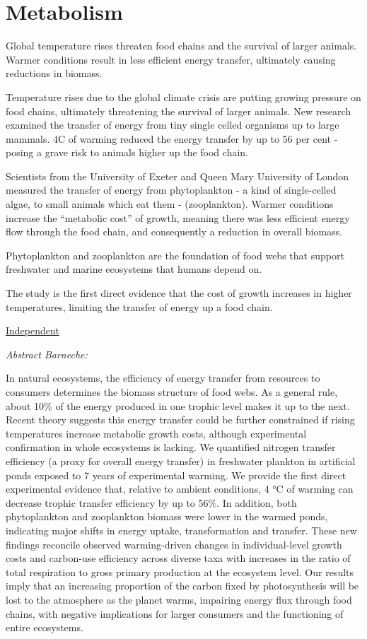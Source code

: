 \documentclass[
]{book}
\begin{document}
\hypertarget{metabolism}{%
\section{Metabolism}\label{metabolism}}

Global temperature rises threaten food chains and the survival of larger animals.
Warmer conditions result in less efficient energy transfer, ultimately causing reductions in biomass.

Temperature rises due to the global climate crisis are putting growing pressure on food chains,
ultimately threatening the survival of larger animals.
New research examined the transfer of energy from tiny single celled organisms up to large mammals.
4C of warming reduced the energy transfer by up to 56 per cent -
posing a grave risk to animals higher up the food chain.

Scientists from the University of Exeter and Queen Mary University of London
measured the transfer of energy from phytoplankton -
a kind of single-celled algae, to small animals which eat them - (zooplankton).
Warmer conditions increase the ``metabolic cost'' of growth,
meaning there was less efficient energy flow through the food chain,
and consequently a reduction in overall biomass.

Phytoplankton and zooplankton are the foundation of food webs that
support freshwater and marine ecosystems that humans depend on.

The study is the first direct evidence that the cost of growth increases in higher temperatures,
limiting the transfer of energy up a food chain.

\href{https://www.independent.co.uk/climate-change/news/food-chains-global-warming-animals-b1809501.html}{Independent}

\emph{Abstract Barneche:}

In natural ecosystems, the efficiency of energy transfer from resources to consumers
determines the biomass structure of food webs.
As a general rule, about 10\% of the energy produced in one trophic level makes it up to the next.
Recent theory suggests this energy transfer could be further constrained
if rising temperatures increase metabolic growth costs,
although experimental confirmation in whole ecosystems is lacking.
We quantified nitrogen transfer efficiency (a proxy for overall energy transfer)
in freshwater plankton in artificial ponds exposed to 7 years of experimental warming.
We provide the first direct experimental evidence that, relative to ambient conditions,
4 °C of warming can decrease trophic transfer efficiency by up to 56\%.
In addition, both phytoplankton and zooplankton biomass were lower in the warmed ponds,
indicating major shifts in energy uptake, transformation and transfer.
These new findings reconcile observed warming-driven changes in individual-level growth costs
and carbon-use efficiency across diverse taxa
with increases in the ratio of total respiration to gross primary production at the ecosystem level.
Our results imply that an increasing proportion of the carbon fixed by photosynthesis
will be lost to the atmosphere as the planet warms,
impairing energy flux through food chains,
with negative implications for larger consumers and the functioning of entire ecosystems.
\end{document}
